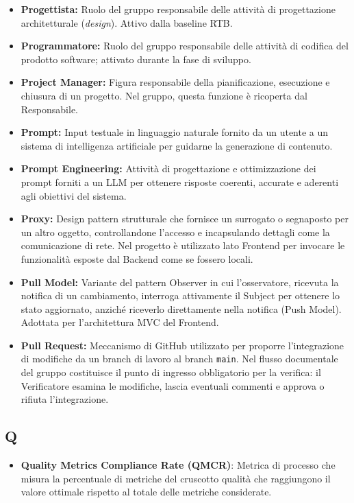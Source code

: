 \begin{itemize}[leftmargin=*]
            superiore invalicabile durante lo svolgimento del progetto.
      \item \textbf{Progettista:} Ruolo del gruppo responsabile delle attività di
            progettazione architetturale (\textit{design}). Attivo dalla baseline RTB.
      \item \textbf{Programmatore:} Ruolo del gruppo responsabile delle attività di
            codifica del prodotto software; attivato durante la fase di sviluppo.
      \item \textbf{Project Manager:} Figura responsabile della pianificazione, esecuzione e chiusura di un progetto. Nel gruppo, questa funzione è ricoperta dal Responsabile.
      \item \textbf{Prompt:} Input testuale in linguaggio naturale fornito da un
            utente a un sistema di intelligenza artificiale per guidarne la
            generazione di contenuto.
      \item \textbf{Prompt Engineering:} Attività di progettazione e ottimizzazione dei prompt forniti a un LLM per ottenere risposte coerenti, accurate e aderenti agli obiettivi del sistema.
      \item \textbf{Proxy:} Design pattern strutturale che fornisce un surrogato o segnaposto per un altro oggetto, controllandone l'accesso e incapsulando dettagli come la comunicazione di rete. Nel progetto è utilizzato lato Frontend per invocare le funzionalità esposte dal Backend come se fossero locali.
      \item \textbf{Pull Model:} Variante del pattern Observer in cui l'osservatore, ricevuta la notifica di un cambiamento, interroga attivamente il Subject per ottenere lo stato aggiornato, anziché riceverlo direttamente nella notifica (Push Model). Adottata per l'architettura MVC del Frontend.
      \item \textbf{Pull Request:} Meccanismo di GitHub utilizzato per proporre
          l'integrazione di modifiche da un branch di lavoro al branch
          \texttt{main}. Nel flusso documentale del gruppo costituisce il punto
          di ingresso obbligatorio per la verifica: il Verificatore esamina le
          modifiche, lascia eventuali commenti e approva o rifiuta l'integrazione.
\end{itemize}
 
{}
\subsection*{Q}
\begin{itemize}[leftmargin=*]
      \item \textbf{Quality Metrics Compliance Rate (QMCR)}: Metrica di processo che misura
      la percentuale di metriche del cruscotto qualità che raggiungono il valore
      ottimale rispetto al totale delle metriche considerate.
\end{itemize}
 
